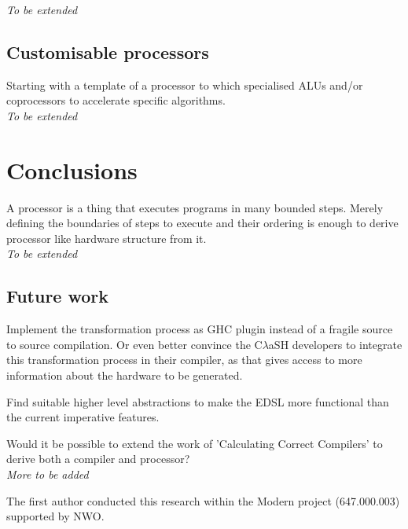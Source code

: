 \documentclass[preprint]{sigplanconf}
\def\clash{C$\lambda$aSH\xspace}
\begin{document}
\textit{To be extended}

\subsection{Customisable processors}
Starting with a template of a processor to which specialised ALUs and/or coprocessors to accelerate specific algorithms. \\

\textit{To be extended}


\section{Conclusions}

A processor is a thing that executes programs in many bounded steps.
Merely defining the boundaries of steps to execute and their ordering is enough to derive processor like hardware structure from it. \\

\textit{To be extended}



\subsection{Future work}
Implement the transformation process as GHC plugin instead of a fragile source to source compilation.
Or even better convince the \clash developers to integrate this transformation process in their compiler, as that gives access to more information about the hardware to be generated.

Find suitable higher level abstractions to make the EDSL more functional than the current imperative features.

Would it be possible to extend the work of 'Calculating Correct Compilers' \cite{CCC} to derive both a compiler and processor? \\

\textit{More to be added}



\begin{acks}
The first author conducted this research within the Modern project (647.000.003) supported by NWO.
\end{acks}


\end{document}

